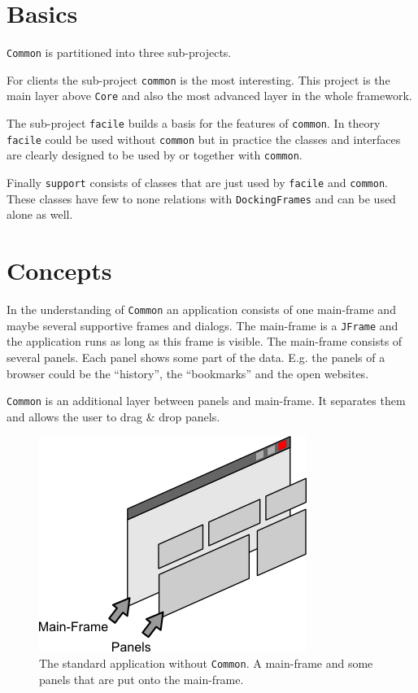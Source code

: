 \documentclass[a4paper,10pt]{article}
\newcommand{\src}[1]{\texttt{#1}}
\begin{document}
\section{Basics}
\src{Common} is partitioned into three sub-projects.

For clients the sub-project \src{common} is the most interesting. This project is the main layer above \src{Core} and also the most advanced layer in the whole framework.

The sub-project \src{facile} builds a basis for the features of \src{common}. In theory \src{facile} could be used without \src{common} but in practice the classes and interfaces are clearly designed to be used by or together with \src{common}.

Finally \src{support} consists of classes that are just used by \src{facile} and \src{common}. These classes have few to none relations with \src{DockingFrames} and can be used alone as well.

\section{Concepts}
In the understanding of \src{Common} an application consists of one main-frame and maybe several supportive frames and dialogs. The main-frame is a \src{JFrame} and the application runs as long as this frame is visible. The main-frame consists of several panels. Each panel shows some part of the data. E.g. the panels of a browser could be the ``history'', the ``bookmarks'' and the open websites.

\src{Common} is an additional layer between panels and main-frame. It separates them and allows the user to drag \& drop panels.

\begin{figure}[ht]
\centering
\includegraphics[scale=1]{app_without}
\caption{The standard application without \src{Common}. A main-frame and some panels that are put onto the main-frame.}
\label{fig:app_without}
\end{figure}
\end{document}
